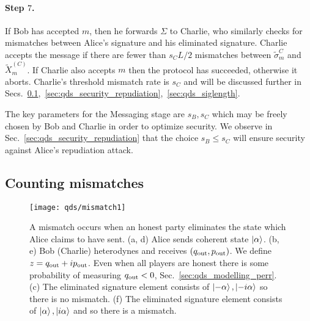 
\paragraph{Step $7$.} If Bob has accepted $m$, then he forwards $\Sigma$ to Charlie, who similarly checks for mismatches between Alice's signature and his eliminated signature. Charlie accepts the message if %
there are fewer than $s_C L/2$  mismatches between $\tilde{\sigma}_m^C$ and $\tilde{X}_m^{\left(C\right)}$. If Charlie also accepts $m$ then the protocol has succeeded, otherwise it aborts.  Charlie's threshold mismatch rate is $s_C$ and will be discussed further in Secs.~\ref{sec:qds_mismatches},~\ref{sec:qds_security_repudiation},~\ref{sec:qds_siglength}.

The key parameters for the Messaging stage are $s_B, s_C$ which may be freely chosen by Bob and Charlie in order to optimize security. We observe in Sec.~\ref{sec:qds_security_repudiation} that the choice $s_B \le s_C$ will ensure security against Alice's repudiation attack.

\subsection{Counting mismatches}\label{sec:qds_mismatches}

\begin{figure}[htp]
\captionsetup{width=0.8\linewidth}
\centering
\texttt{[image: qds/mismatch1]}
\caption{\label{fig:qds_mismatches} A mismatch occurs when an honest party eliminates the state which Alice claims to have sent. (a, d) Alice sends coherent state $\ket{\alpha}$. (b, e) Bob (Charlie) heterodynes and receives $\left(q_{\text{out}}, p_{\text{out}}\right)$. We define $z = q_{\text{out}} + i p_{\text{out}}$. Even when all players are honest there is some probability of measuring $q_{\text{out}} < 0$, Sec.~\ref{sec:qds_modelling_perr}. (c) The eliminated signature element consists of $\ket{- \alpha}, \ket{- i \alpha}$ so there is no mismatch. (f) The eliminated signature element consists of $\ket{\alpha}, \ket{i \alpha}$ and so there is a mismatch.}
\end{figure}


